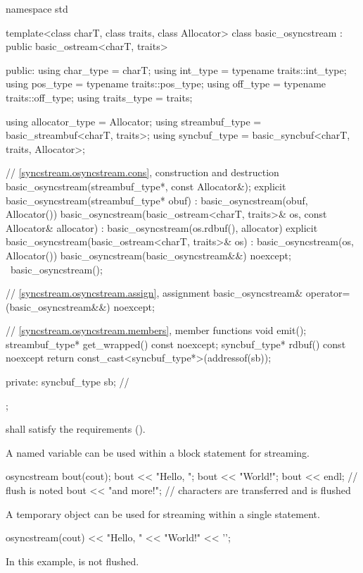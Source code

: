 %
\begin{codeblock}
namespace std {
  template<class charT, class traits, class Allocator>
  class basic_osyncstream : public basic_ostream<charT, traits> {
  public:
    using char_type   = charT;
    using int_type    = typename traits::int_type;
    using pos_type    = typename traits::pos_type;
    using off_type    = typename traits::off_type;
    using traits_type = traits;

    using allocator_type = Allocator;
    using streambuf_type = basic_streambuf<charT, traits>;
    using syncbuf_type   = basic_syncbuf<charT, traits, Allocator>;

    // \ref{syncstream.osyncstream.cons}, construction and destruction
    basic_osyncstream(streambuf_type*, const Allocator&);
    explicit basic_osyncstream(streambuf_type* obuf)
      : basic_osyncstream(obuf, Allocator()) {}
    basic_osyncstream(basic_ostream<charT, traits>& os, const Allocator& allocator)
      : basic_osyncstream(os.rdbuf(), allocator) {}
    explicit basic_osyncstream(basic_ostream<charT, traits>& os)
      : basic_osyncstream(os, Allocator()) {}
    basic_osyncstream(basic_osyncstream&&) noexcept;
    ~basic_osyncstream();

    // \ref{syncstream.osyncstream.assign}, assignment
    basic_osyncstream& operator=(basic_osyncstream&&) noexcept;

    // \ref{syncstream.osyncstream.members}, member functions
    void emit();
    streambuf_type* get_wrapped() const noexcept;
    syncbuf_type* rdbuf() const noexcept { return const_cast<syncbuf_type*>(addressof(sb)); }

  private:
    syncbuf_type sb;    // \expos
  };
}
\end{codeblock}

\pnum
{} shall satisfy the  requirements
().

\pnum
\begin{example}
A named variable can be used within a block statement for streaming.
\begin{codeblock}
{
  osyncstream bout(cout);
  bout << "Hello, ";
  bout << "World!";
  bout << endl; // flush is noted
  bout << "and more!\n";
}   // characters are transferred and  is flushed
\end{codeblock}
\end{example}

\pnum
\begin{example}
A temporary object can be used for streaming within a single statement.
\begin{codeblock}
osyncstream(cout) << "Hello, " << "World!" << '\n';
\end{codeblock}
In this example,  is not flushed.
\end{example}

